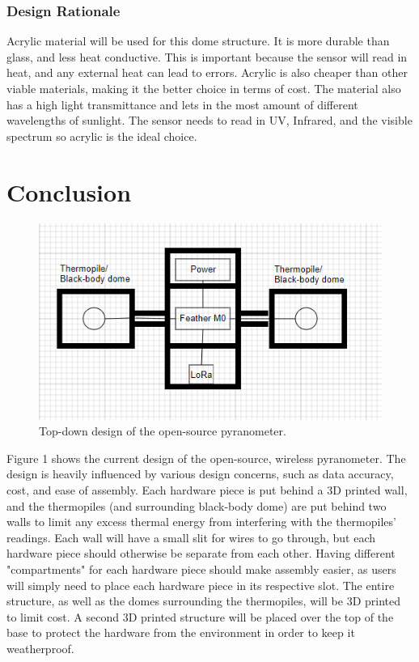 \documentclass[10pt,draftclsnofoot,onecolumn,letterpaper]{article}
\begin{document}
\subsubsection{Design Rationale}
Acrylic material will be used for this dome structure. It is more durable than glass, and less heat conductive. This is important because the sensor will read in heat, and any external heat can lead to errors. Acrylic is also cheaper than other viable materials, making it the better choice in terms of cost. The material also has a high light transmittance and lets in the most amount of different wavelengths of sunlight. The sensor needs to read in UV, Infrared, and the visible spectrum so acrylic is the ideal choice.

\section{Conclusion}
\begin{figure}[h]
\centering
\includegraphics[natwidth=504,natheight=289]{pyro.PNG}
\caption{Top-down design of the open-source pyranometer.}
\end{figure}
Figure 1 shows the current design of the open-source, wireless pyranometer. The design is heavily influenced by various design concerns, such as data accuracy, cost, and ease of assembly. Each hardware piece is put behind a 3D printed wall, and the thermopiles (and surrounding black-body dome) are put behind two walls to limit any excess thermal energy from interfering with the thermopiles' readings. Each wall will have a small slit for wires to go through, but each hardware piece should otherwise be separate from each other. Having different "compartments" for each hardware piece should make assembly easier, as users will simply need to place each hardware piece in its respective slot. The entire structure, as well as the domes surrounding the thermopiles, will be 3D printed to limit cost. A second 3D printed structure will be placed over the top of the base to protect the hardware from the environment in order to keep it weatherproof.\\\\
\end{document}
